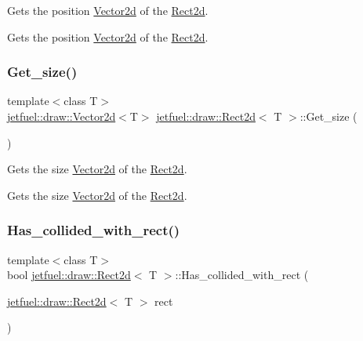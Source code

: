 Gets the position \hyperlink{classjetfuel_1_1draw_1_1Vector2d}{Vector2d} of the \hyperlink{classjetfuel_1_1draw_1_1Rect2d}{Rect2d}. 

Gets the position \hyperlink{classjetfuel_1_1draw_1_1Vector2d}{Vector2d} of the \hyperlink{classjetfuel_1_1draw_1_1Rect2d}{Rect2d}. \mbox{\label{classjetfuel_1_1draw_1_1Rect2d_a3e14b3f59200c452a08085c724950afb}} 
\subsubsection{\texorpdfstring{Get\+\_\+size()}{Get\_size()}}
{\footnotesize\ttfamily template$<$class T$>$ \\
\hyperlink{classjetfuel_1_1draw_1_1Vector2d}{jetfuel\+::draw\+::\+Vector2d}$<$T$>$ \hyperlink{classjetfuel_1_1draw_1_1Rect2d}{jetfuel\+::draw\+::\+Rect2d}$<$ T $>$\+::Get\+\_\+size (\begin{DoxyParamCaption}{ }\end{DoxyParamCaption})\hspace{0.3cm}{\ttfamily [inline]}}



Gets the size \hyperlink{classjetfuel_1_1draw_1_1Vector2d}{Vector2d} of the \hyperlink{classjetfuel_1_1draw_1_1Rect2d}{Rect2d}. 

Gets the size \hyperlink{classjetfuel_1_1draw_1_1Vector2d}{Vector2d} of the \hyperlink{classjetfuel_1_1draw_1_1Rect2d}{Rect2d}. \mbox{\label{classjetfuel_1_1draw_1_1Rect2d_ae29d8f3e8a6f522d6aacdd00b8d3f757}} 
\subsubsection{\texorpdfstring{Has\+\_\+collided\+\_\+with\+\_\+rect()}{Has\_collided\_with\_rect()}}
{\footnotesize\ttfamily template$<$class T$>$ \\
bool \hyperlink{classjetfuel_1_1draw_1_1Rect2d}{jetfuel\+::draw\+::\+Rect2d}$<$ T $>$\+::Has\+\_\+collided\+\_\+with\+\_\+rect (\begin{DoxyParamCaption}\item[{\hyperlink{classjetfuel_1_1draw_1_1Rect2d}{jetfuel\+::draw\+::\+Rect2d}$<$ T $>$}]{rect }\end{DoxyParamCaption})\hspace{0.3cm}{\ttfamily [inline]}}



